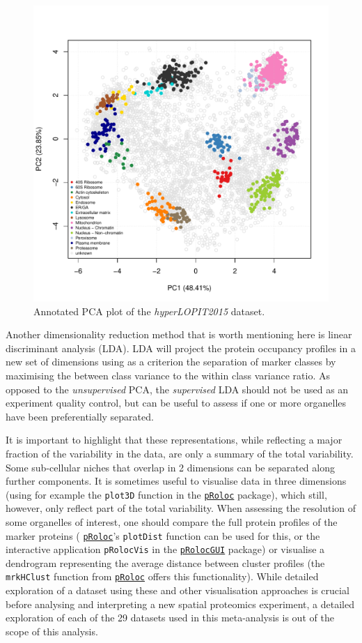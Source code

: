 \documentclass[12pt]{article}\usepackage[]{graphicx}\usepackage[]{color}
\newenvironment{knitrout}{}{} %
\newcommand{\Rpackage}[1]{\texttt{#1}}
\newcommand\Biocpkg[1]{%
  {\href{http://bioconductor.org/packages/#1}%
    {\Rpackage{#1}}}}
\begin{document}
\begin{figure}[ht]
  \centering
\begin{knitrout}
\color{fgcolor}
\includegraphics[width=0.75\linewidth]{figure/pcahl-1} 

\end{knitrout}
  \caption{Annotated PCA plot of the \textit{hyperLOPIT2015} dataset.}
  \label{fig:pcahl}
\end{figure}

Another dimensionality reduction method that is worth mentioning here
is linear discriminant analysis (LDA). LDA will project the protein
occupancy profiles in a new set of dimensions using as a criterion the
separation of marker classes by maximising the between class variance
to the within class variance ratio. As opposed to the
\textit{unsupervised} PCA, the \textit{supervised} LDA should not be
used as an experiment quality control, but can be useful to assess if
one or more organelles have been preferentially separated.

\bigskip

It is important to highlight that these representations, while
reflecting a major fraction of the variability in the data, are only a
summary of the total variability. Some sub-cellular niches that
overlap in 2 dimensions can be separated along further components. It
is sometimes useful to visualise data in three dimensions (using for
example the \texttt{plot3D} function in the \Biocpkg{pRoloc} package),
which still, however, only reflect part of the total variability. When
assessing the resolution of some organelles of interest, one should
compare the full protein profiles of the marker proteins
(\Biocpkg{pRoloc}'s \texttt{plotDist} function can be used for this, or
the interactive application \texttt{pRolocVis} in the \Biocpkg{pRolocGUI}
package) or visualise a dendrogram representing the average distance between
cluster profiles (the \texttt{mrkHClust} function from
\Biocpkg{pRoloc} offers this functionality). While detailed
exploration of a dataset using these and other visualisation
approaches is crucial before analysing and interpreting a new spatial
proteomics experiment, a detailed exploration of each of the
29 datasets used in this meta-analysis is out of the
scope of this analysis.
\end{document}
